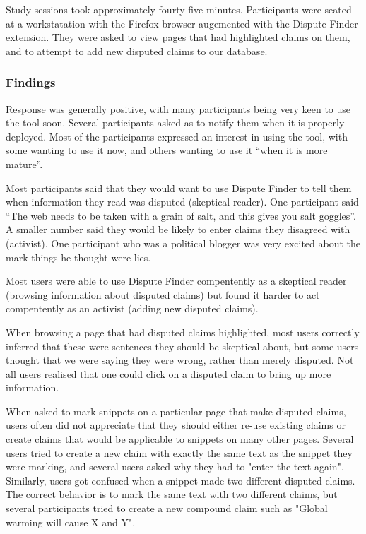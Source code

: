 \documentclass{www2010-submission}
\newcommand{\todo}[1]{}
\begin{document}
Study sessions took approximately fourty five minutes. Participants were seated at a workstatation with the Firefox browser augemented with the Dispute Finder extension. They were asked to view pages that had highlighted claims on them, and to attempt to add new disputed claims to our database.

\todo{Need to finish the third wave of user studies}

\subsubsection{Findings}

Response was generally positive, with many participants being very keen to use the tool soon. Several participants asked as to notify them when it is properly deployed. Most of the participants expressed an interest in using the tool, with some wanting to use it now, and others wanting to use it ``when it is more mature''.

Most participants said that they would want to use Dispute Finder to tell them when information they read was disputed (skeptical reader). One participant said ``The web needs to be taken with a grain of salt, and this gives you salt goggles''. A smaller number said they would be likely to enter claims they disagreed with (activist). One participant who was a political blogger was very excited about the mark things he thought were lies.

Most users were able to use Dispute Finder compentently as a skeptical reader (browsing information about disputed claims) but found it harder to act compentently as an activist (adding new disputed claims).

When browsing a page that had disputed claims highlighted, most users correctly inferred that these were sentences they should be skeptical about, but some users thought that we were saying they were wrong, rather than merely disputed. Not all users realised that one could click on a disputed claim to bring up more information.

%

When asked to mark snippets on a particular page that make disputed claims, users often did not appreciate that they should either re-use existing claims or create claims that would be applicable to snippets on many other pages. Several users tried to create a new claim with exactly the same text as the snippet they were marking, and several users asked why they had to "enter the text again". Similarly, users got confused when a snippet made two different disputed claims. The correct behavior is to mark the same text with two different claims, but several participants tried to create a new compound claim such as "Global warming will cause X and Y". 
\end{document}
